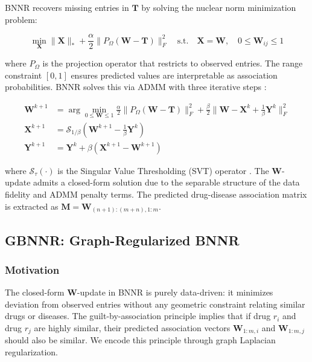 \documentclass[unnumsec,webpdf,contemporary,large]{oup-authoring-template}
\begin{document}
BNNR recovers missing entries in $\mathbf{T}$ by solving the nuclear norm minimization problem:

\begin{equation}
\min_{\mathbf{X}} \|\mathbf{X}\|_* + \frac{\alpha}{2} \|P_\Omega(\mathbf{W} - \mathbf{T})\|_F^2 \quad \text{s.t.} \quad \mathbf{X} = \mathbf{W}, \quad 0 \leq \mathbf{W}_{ij} \leq 1
\label{eq:bnnr_obj}
\end{equation}

where $P_\Omega$ is the projection operator that restricts to observed entries. The range constraint $[0, 1]$ ensures predicted values are interpretable as association probabilities. BNNR solves this via ADMM with three iterative steps \citep{boyd2011}:

\begin{align}
\mathbf{W}^{k+1} &= \arg\min_{0 \leq \mathbf{W} \leq 1} \frac{\alpha}{2}\|P_\Omega(\mathbf{W} - \mathbf{T})\|_F^2 + \frac{\beta}{2}\|\mathbf{W} - \mathbf{X}^k + \frac{1}{\beta}\mathbf{Y}^k\|_F^2 \label{eq:bnnr_w_update} \\
\mathbf{X}^{k+1} &= \mathcal{S}_{1/\beta}\left(\mathbf{W}^{k+1} - \frac{1}{\beta}\mathbf{Y}^k\right) \label{eq:bnnr_x_update} \\
\mathbf{Y}^{k+1} &= \mathbf{Y}^k + \beta(\mathbf{X}^{k+1} - \mathbf{W}^{k+1}) \label{eq:bnnr_y_update}
\end{align}

where $\mathcal{S}_\tau(\cdot)$ is the Singular Value Thresholding (SVT) operator \citep{cai2010}. The $\mathbf{W}$-update admits a closed-form solution due to the separable structure of the data fidelity and ADMM penalty terms. The predicted drug-disease association matrix is extracted as $\mathbf{M} = \mathbf{W}_{(n+1):(m+n), 1:m}$.

\subsection{GBNNR: Graph-Regularized BNNR}
\label{sec:gbnnr}

\subsubsection{Motivation}
\label{sec:gbnnr_motivation}

The closed-form $\mathbf{W}$-update in BNNR is purely data-driven: it minimizes deviation from observed entries without any geometric constraint relating similar drugs or diseases. The guilt-by-association principle implies that if drug $r_i$ and drug $r_j$ are highly similar, their predicted association vectors $\mathbf{W}_{1:m, i}$ and $\mathbf{W}_{1:m, j}$ should also be similar. We encode this principle through graph Laplacian regularization.
\end{document}
